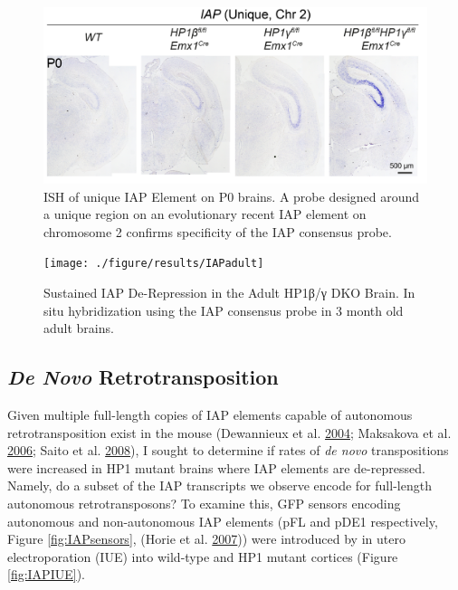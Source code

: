 \documentclass[onehalf,12pt]{beavtex}
\begin{document}
  \begin{figure}
  
  {\centering \includegraphics[width=1\linewidth, ]{./figure/results/IAPchr2} 
  
  }
  
  \caption[ISH of Unique IAP Element]{ISH of unique IAP Element on P0 brains.  A probe designed around a unique region on an evolutionary recent IAP element on chromosome 2 confirms specificity of the IAP consensus probe.}\label{fig:IAPchr2}
  \end{figure}
  
  \begin{figure}
  
  {\centering \texttt{[image: ./figure/results/IAPadult]} 
  
  }
  
  \caption[Sustained IAP De-Repression in the Adult HP1β/γ DKO Brain]{Sustained IAP De-Repression in the Adult HP1β/γ DKO Brain. In situ hybridization using the IAP consensus probe in 3 month old adult brains.}\label{fig:IAPadult}
  \end{figure}
  
  \FloatBarrier
  
  \subsection{\texorpdfstring{\emph{De Novo}
  Retrotransposition}{De Novo Retrotransposition}}\label{de-novo-retrotransposition}
  
  Given multiple full-length copies of IAP elements capable of autonomous
  retrotransposition exist in the mouse (Dewannieux et al.
  \protect\hyperlink{ref-DewannieuxIdentificationautonomousIAP2004}{2004};
  Maksakova et al.
  \protect\hyperlink{ref-MaksakovaRetroviralElementsTheir2006}{2006};
  Saito et al.
  \protect\hyperlink{ref-SaitoTranslationnonautonomoustype2008}{2008}), I
  sought to determine if rates of \emph{de novo} transpositions were
  increased in HP1 mutant brains where IAP elements are de-repressed.
  Namely, do a subset of the IAP transcripts we observe encode for
  full-length autonomous retrotransposons? To examine this, GFP sensors
  encoding autonomous and non-autonomous IAP elements (pFL and pDE1
  respectively, Figure \ref{fig:IAPsensors}, (Horie et al.
  \protect\hyperlink{ref-HorieRetrotransposonsInfluenceMouse2007a}{2007}))
  were introduced by in utero electroporation (IUE) into wild-type and HP1
  mutant cortices (Figure \ref{fig:IAPIUE}).
  
\end{document}
